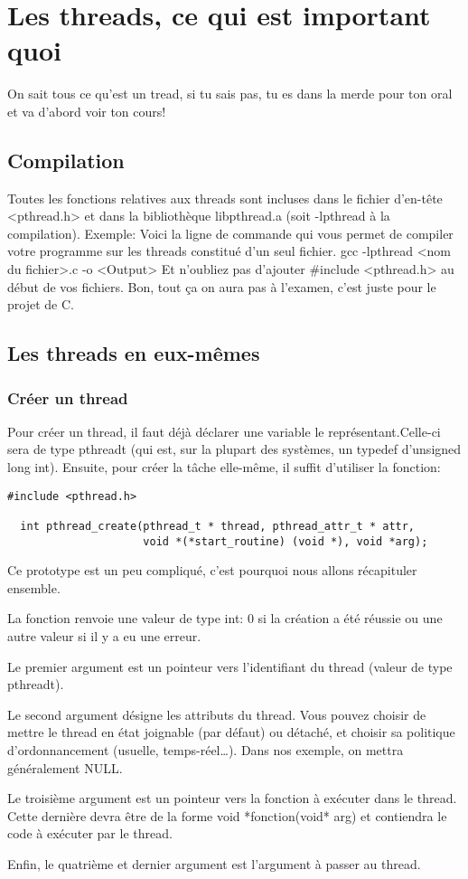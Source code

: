 \documentclass[a4paper]{article}
\begin{document}
\section{Les threads, ce qui est important quoi}
On sait tous ce qu'est un tread, si tu sais pas, tu es dans la merde pour ton oral et va d'abord voir ton cours!
\subsection{Compilation}
Toutes les fonctions relatives aux threads sont incluses dans le fichier d'en-tête <pthread.h> et dans la bibliothèque libpthread.a (soit -lpthread à la compilation).\newline
Exemple:\newline
Voici la ligne de commande qui vous permet de compiler votre programme sur les threads constitué d'un seul fichier.\newline
gcc -lpthread <nom du fichier>.c -o <Output>\newline
Et n'oubliez pas d'ajouter \#include <pthread.h> au début de vos fichiers.
Bon, tout ça on aura pas à l'examen, c'est juste pour le projet de C.
\subsection{Les threads en eux-mêmes}
\subsubsection{Créer un thread}
Pour créer un thread, il faut déjà déclarer une variable le représentant.Celle-ci sera de type pthread\textunderscore{}t (qui est, sur la plupart des systèmes, un typedef d'unsigned long int). Ensuite, pour créer la tâche elle-même, il suffit d'utiliser la fonction:
\begin{lstlisting}
#include <pthread.h>

  int pthread_create(pthread_t * thread, pthread_attr_t * attr,
                     void *(*start_routine) (void *), void *arg);
\end{lstlisting}
Ce prototype est un peu compliqué, c'est pourquoi nous allons récapituler ensemble.
\begin{description}
  \item La fonction renvoie une valeur de type int: 0 si la création a été réussie ou une autre valeur si il y a eu une erreur.
  \item Le premier argument est un pointeur vers l'identifiant du thread (valeur de type pthread\textunderscore{}t).
  \item Le second argument désigne les attributs du thread. Vous pouvez choisir de mettre le thread en état joignable (par défaut) ou détaché, et choisir sa politique d'ordonnancement (usuelle, temps-réel\ldots). Dans nos exemple, on mettra généralement NULL.
  \item Le troisième argument est un pointeur vers la fonction à exécuter dans le thread. Cette dernière devra être de la forme \guillemotleft{}void *fonction(void* arg)\guillemotright{} et contiendra le code à exécuter par le thread.
  \item Enfin, le quatrième et dernier argument est l'argument à passer au thread.
\end{description}
\end{document}
